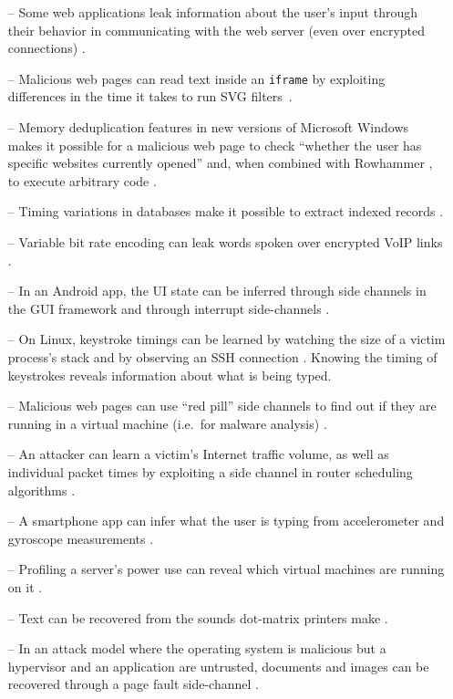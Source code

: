 \documentclass[letterpaper,twocolumn,10pt]{article}
\begin{document}
\begin{itemize}
    \item[--] Some web applications leak information about the user's input through
          their behavior in communicating with the web server (even over
          encrypted connections) \cite{bortz2007exposing, chen2010side}.
    \item[--] Malicious web pages can read text inside an \texttt{iframe} by
        exploiting differences in the time it takes to run SVG
        filters~\cite{pixelperfect, andrysco2015subnormal}. 
    \item[--] Memory deduplication features in new versions of Microsoft Windows
        makes it possible for a malicious web page to check ``whether the user
        has specific websites currently opened'' \cite{gruss2015practical} and,
        when combined with Rowhammer \cite{kim2014flipping}, to execute
        arbitrary code \cite{bosman2016dedup}.
    \item[--] Timing variations in databases make it possible to extract
          indexed records \cite{futoransky2007nd2db}.
    \item[--] Variable bit rate encoding can leak words spoken over encrypted
        VoIP links \cite{white2011phonotactic}.
    \item[--] In an Android app, the UI state can be inferred through side channels
          in the GUI framework \cite{chen2014peeking} and through interrupt
          side-channels \cite{diao2016no}.
    \item[--] On Linux, keystroke timings can be learned by watching the size of
          a victim process's stack \cite{zhang2009peeping} and by observing an
          SSH connection \cite{song2001timing}. Knowing the timing of keystrokes
          reveals information about what is being typed.
    \item[--] Malicious web pages can use ``red pill'' side channels to find out if
          they are running in a virtual machine (i.e.\ for malware analysis)
          \cite{ho2014tick}.
    \item[--] An attacker can learn a victim's Internet traffic volume, as well as
          individual packet times by exploiting a side channel in router
          scheduling algorithms \cite{kadloor2010low}.
    \item[--] A smartphone app can infer what the user is typing from accelerometer
          and gyroscope measurements \cite{owusu2012accessory,
          cai2012practicality}.
    \item[--] Profiling a server's power use can reveal which virtual machines
        are running on it \cite{hlavacs2011energy}.
    \item[--] Text can be recovered from the sounds dot-matrix printers make
          \cite{backes2010acoustic}.
    \item[--] In an attack model where the operating system is malicious but
        a hypervisor and an application are untrusted, documents and images can
        be recovered through a page fault side-channel \cite{xu2011exploration}.
\end{itemize}
\end{document}
